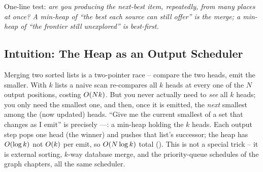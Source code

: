\begin{recognitionbox}
One-line test: \emph{are you producing the next-best item, repeatedly, from many places at once? A min-heap of
``the best each source can still offer'' is the merge; a min-heap of ``the frontier still unexplored'' is
best-first.}
\end{recognitionbox}

\subsection{Intuition: The Heap as an Output Scheduler}

Merging two sorted lists is a two-pointer race -- compare the two heads, emit the smaller. With $k$ lists a
naive scan re-compares all $k$ heads at every one of the $N$ output positions, costing $O(Nk)$. But you
never actually need to \emph{see} all $k$ heads; you only need the smallest one, and then, once it is
emitted, the \emph{next} smallest among the (now updated) heads. ``Give me the current smallest of a set that
changes as I emit'' is precisely ----: a min-heap holding the $k$ heads.
Each output step pops one head (the winner) and pushes that list's successor; the heap has $O(\log k)$
not $O(k)$ per emit, so $O(N\log k)$ total (). This is not a special trick --
it is external sorting, $k$-way database merge, and the priority-queue schedules of the graph chapters, all
the same scheduler.

